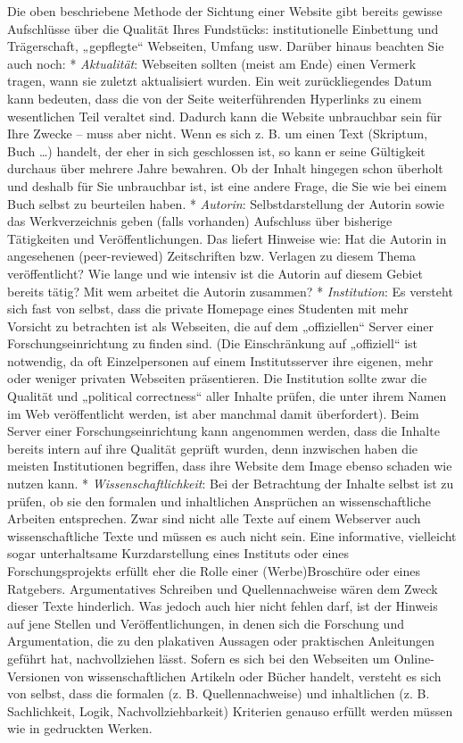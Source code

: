 \documentclass[]{book}
\theoremstyle{definition}
\theoremstyle{definition}
\theoremstyle{definition}
\theoremstyle{remark}
\begin{document}
Die oben beschriebene Methode der Sichtung einer Website gibt bereits
gewisse Aufschlüsse über die Qualität Ihres Fundstücks: institutionelle
Einbettung und Trägerschaft, „gepflegte`` Webseiten, Umfang usw. Darüber
hinaus beachten Sie auch noch: * \emph{Aktualität}: Webseiten sollten
(meist am Ende) einen Vermerk tragen, wann sie zuletzt aktualisiert
wurden. Ein weit zurückliegendes Datum kann bedeuten, dass die von der
Seite weiterführenden Hyperlinks zu einem wesentlichen Teil veraltet
sind. Dadurch kann die Website unbrauchbar sein für Ihre Zwecke -- muss
aber nicht. Wenn es sich z. B. um einen Text (Skriptum, Buch \ldots{})
handelt, der eher in sich geschlossen ist, so kann er seine Gültigkeit
durchaus über mehrere Jahre bewahren. Ob der Inhalt hingegen schon
überholt und deshalb für Sie unbrauchbar ist, ist eine andere Frage, die
Sie wie bei einem Buch selbst zu beurteilen haben. * \emph{Autorin}:
Selbstdarstellung der Autorin sowie das Werkverzeichnis geben (falls
vorhanden) Aufschluss über bisherige Tätigkeiten und Veröffentlichungen.
Das liefert Hinweise wie: Hat die Autorin in angesehenen (peer-reviewed)
Zeitschriften bzw. Verlagen zu diesem Thema veröffentlicht? Wie lange
und wie intensiv ist die Autorin auf diesem Gebiet bereits tätig? Mit
wem arbeitet die Autorin zusammen? * \emph{Institution}: Es versteht
sich fast von selbst, dass die private Homepage eines Studenten mit mehr
Vorsicht zu betrachten ist als Webseiten, die auf dem „offiziellen``
Server einer Forschungseinrichtung zu finden sind. (Die Einschränkung
auf „offiziell`` ist notwendig, da oft Einzelpersonen auf einem
Institutsserver ihre eigenen, mehr oder weniger privaten Webseiten
präsentieren. Die Institution sollte zwar die Qualität und „political
correctness`` aller Inhalte prüfen, die unter ihrem Namen im Web
veröffentlicht werden, ist aber manchmal damit überfordert). Beim Server
einer Forschungseinrichtung kann angenommen werden, dass die Inhalte
bereits intern auf ihre Qualität geprüft wurden, denn inzwischen haben
die meisten Institutionen begriffen, dass ihre Website dem Image ebenso
schaden wie nutzen kann. * \emph{Wissenschaftlichkeit}: Bei der
Betrachtung der Inhalte selbst ist zu prüfen, ob sie den formalen und
inhaltlichen Ansprüchen an wissenschaftliche Arbeiten entsprechen. Zwar
sind nicht alle Texte auf einem Webserver auch wissenschaftliche Texte
und müssen es auch nicht sein. Eine informative, vielleicht sogar
unterhaltsame Kurzdarstellung eines Instituts oder eines
Forschungsprojekts erfüllt eher die Rolle einer (Werbe)Broschüre oder
eines Ratgebers. Argumentatives Schreiben und Quellennachweise wären dem
Zweck dieser Texte hinderlich. Was jedoch auch hier nicht fehlen darf,
ist der Hinweis auf jene Stellen und Veröffentlichungen, in denen sich
die Forschung und Argumentation, die zu den plakativen Aussagen oder
praktischen Anleitungen geführt hat, nachvollziehen lässt. Sofern es
sich bei den Webseiten um Online-Versionen von wissenschaftlichen
Artikeln oder Bücher handelt, versteht es sich von selbst, dass die
formalen (z. B. Quellennachweise) und inhaltlichen (z. B. Sachlichkeit,
Logik, Nachvollziehbarkeit) Kriterien genauso erfüllt werden müssen wie
in gedruckten Werken.
\end{document}
